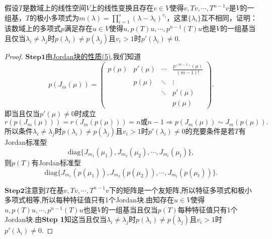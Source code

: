 \documentclass[../../main.tex]{subfiles}%
\begin{document}
\begin{example}
假设\( T \)是数域上的线性空间\( V \)上的线性变换且存在\( v \in V \)使得\( v,Tv,\cdots,T^{n-1}v \)是\( V \)的一组基，\( T \)的极小多项式为\( m(\lambda)=\prod_{i=1}^{s}(\lambda-\lambda_i)^{v_i} \)，这里\( \{\lambda_i\} \)互不相同，证明：该数域上的多项式\( p \)满足存在\( u \in V \)使得\( u,p(T)u,\cdots,p^{n-1}(T)u \)也是\( V \)的一组基当且仅当\( \lambda_i \neq \lambda_j \)时\( p(\lambda_i) \neq p(\lambda_j) \)且\( v_i > 1 \)时\( p'(\lambda_i) \neq 0 \).
\end{example}
\begin{proof}

$\mathbf{Step}\mathbf{1}$由\hyperref[proposition:Jordan块的性质]{Jordan块的性质(5)},我们知道
\[
p\left(J_m(\mu)\right)=\begin{pmatrix}
p(\mu)& p'(\mu)& \cdots& \frac{p^{(m-1)}(\mu)}{(m-1)!}\\
& p(\mu)& \ddots& \vdots\\
& & \ddots& p'(\mu)\\
& & & p(\mu)
\end{pmatrix}.
\]
即当且仅当$p'(\mu)\neq 0$时成立
\[
r\left( p\left( J_m(\mu ) \right) \right) =r\left( J_m(p(\mu )) \right) =n\text{或}n-1\Longrightarrow 
p\left(J_m(\mu)\right)\sim J_m(p(\mu)).
\]
所以条件$\lambda_i\neq \lambda_j$时$p(\lambda_i)\neq p(\lambda_j)$且$v_i>1$时$p'(\lambda_i)\neq 0$的充要条件是若$T$有Jordan标准型
\[
\text{diag}\{J_{m_1}(\mu_1),J_{m_2}(\mu_2),\cdots,J_{m_t}(\mu_t)\},
\]
则$p(T)$有Jordan标准型
\[
\text{diag}\{J_{m_1}(p(\mu_1)),J_{m_2}(p(\mu_2)),\cdots,J_{m_t}(p(\mu_t))\}.
\]

$\mathbf{Step}\mathbf{2}$注意到$T$在基$v,Tv,\cdots,T^{n-1}v$下的矩阵是一个友矩阵,所以特征多项式和极小多项式相等,所以每种特征值只有1个Jordan块.由知存在$u\in V$使得$u,p(T)u,\cdots,p^{n-1}(T)u$也是$V$的一组基当且仅当$p(T)$每种特征值只有1个Jordan块.由\textbf{Step 1}知这当且仅当$\lambda_i\neq \lambda_j$时$p(\lambda_i)\neq p(\lambda_j)$且$v_i>1$时$p'(\lambda_i)\neq 0$.

\end{proof}
\end{document}
